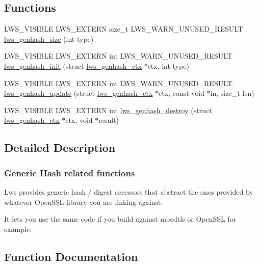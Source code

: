 \subsection*{Functions}
\begin{DoxyCompactItemize}
\item 
L\+W\+S\+\_\+\+V\+I\+S\+I\+B\+LE L\+W\+S\+\_\+\+E\+X\+T\+E\+RN size\+\_\+t L\+W\+S\+\_\+\+W\+A\+R\+N\+\_\+\+U\+N\+U\+S\+E\+D\+\_\+\+R\+E\+S\+U\+LT \hyperlink{group__generic_gac8bc5201d6156bec14956919fe4fcaeb}{lws\+\_\+genhash\+\_\+size} (int type)
\item 
L\+W\+S\+\_\+\+V\+I\+S\+I\+B\+LE L\+W\+S\+\_\+\+E\+X\+T\+E\+RN int L\+W\+S\+\_\+\+W\+A\+R\+N\+\_\+\+U\+N\+U\+S\+E\+D\+\_\+\+R\+E\+S\+U\+LT \hyperlink{group__generic_ga9a5deb937ea81ee82d4a7779af9e7120}{lws\+\_\+genhash\+\_\+init} (struct \hyperlink{structlws__genhash__ctx}{lws\+\_\+genhash\+\_\+ctx} $\ast$ctx, int type)
\item 
L\+W\+S\+\_\+\+V\+I\+S\+I\+B\+LE L\+W\+S\+\_\+\+E\+X\+T\+E\+RN int L\+W\+S\+\_\+\+W\+A\+R\+N\+\_\+\+U\+N\+U\+S\+E\+D\+\_\+\+R\+E\+S\+U\+LT \hyperlink{group__generic_ga474ee7170e63dd01ef5eaee6036beb78}{lws\+\_\+genhash\+\_\+update} (struct \hyperlink{structlws__genhash__ctx}{lws\+\_\+genhash\+\_\+ctx} $\ast$ctx, const void $\ast$in, size\+\_\+t len)
\item 
L\+W\+S\+\_\+\+V\+I\+S\+I\+B\+LE L\+W\+S\+\_\+\+E\+X\+T\+E\+RN int \hyperlink{group__generic_gabdecb2d2658f28ba618734981d071fc2}{lws\+\_\+genhash\+\_\+destroy} (struct \hyperlink{structlws__genhash__ctx}{lws\+\_\+genhash\+\_\+ctx} $\ast$ctx, void $\ast$result)
\end{DoxyCompactItemize}


\subsection{Detailed Description}
\subsubsection*{Generic Hash related functions}

Lws provides generic hash / digest accessors that abstract the ones provided by whatever Open\+S\+SL library you are linking against.

It lets you use the same code if you build against mbedtls or Open\+S\+SL for example. 

\subsection{Function Documentation}
\mbox{\label{group__generic_gabdecb2d2658f28ba618734981d071fc2}} 
